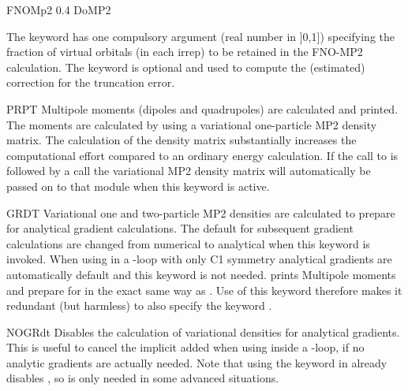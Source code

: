 \begin{keywordlist}
\begin{inputlisting}
FNOMp2
0.4
DoMP2

\end{inputlisting}
The keyword  has one compulsory argument (real number in ]0,1]) specifying the fraction of virtual orbitals
(in each irrep) to be retained in the FNO-MP2 calculation.
The keyword  is optional and used to compute the (estimated) correction for the truncation error.
\item[PRPT]
Multipole moments (dipoles and quadrupoles) are calculated and printed. The moments
are calculated by using a variational one-particle MP2 density matrix.
 The calculation of the density matrix substantially increases
the computational effort compared to an ordinary energy calculation. If the call
to  is followed by a  call the variational MP2
density matrix will automatically be passed on to that module when this keyword
is active.
\item[GRDT]
Variational one and two-particle MP2 densities are calculated to prepare for
analytical gradient calculations. The default for subsequent gradient
calculations are changed from numerical to analytical when this keyword is
invoked. When using  in a -loop with only C1 symmetry
analytical gradients are automatically default and this keyword is not
needed. 
prints Multipole moments and prepare for  in the exact same way
as .
Use of this keyword therefore makes it
redundant (but harmless) to also specify the keyword .
\item[NOGRdt]
Disables the calculation of variational densities for analytical gradients.
This is useful to cancel the implicit  added when using 
inside a -loop, if no analytic gradients are actually needed.
Note that using the  keyword in  already disables
, so  is only needed in some advanced situations.

\end{keywordlist}

